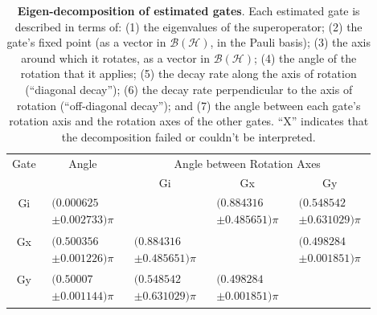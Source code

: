 \documentclass{article}[11pt]
\begin{document}
\begin{table}[h]
\begin{center}
\vspace{2em}
\begin{tabular}[l]{|c|c|c|c|c|}
\hline
\multirow{2}{*}{Gate} & \multirow{2}{*}{Angle} & \multicolumn{3}{c|}{Angle between Rotation Axes} \\ \cline{3-5}
 & & Gi & Gx & Gy \\ \hline
Gi & $ \begin{array}{c}(0.000625 \\ \pm 0.002733)\pi \end{array} $ &  & $ \begin{array}{c}(0.884316 \\ \pm 0.485651)\pi \end{array} $ & $ \begin{array}{c}(0.548542 \\ \pm 0.631029)\pi \end{array} $ \\ \hline
Gx & $ \begin{array}{c}(0.500356 \\ \pm 0.001226)\pi \end{array} $ & $ \begin{array}{c}(0.884316 \\ \pm 0.485651)\pi \end{array} $ &  & $ \begin{array}{c}(0.498284 \\ \pm 0.001851)\pi \end{array} $ \\ \hline
Gy & $ \begin{array}{c}(0.50007 \\ \pm 0.001144)\pi \end{array} $ & $ \begin{array}{c}(0.548542 \\ \pm 0.631029)\pi \end{array} $ & $ \begin{array}{c}(0.498284 \\ \pm 0.001851)\pi \end{array} $ &  \\ \hline
\end{tabular}

\caption{\textbf{Eigen-decomposition of estimated gates}.  Each estimated gate is described in terms of: (1) the eigenvalues of the superoperator; (2) the gate's fixed point (as a vector in $\mathcal{B}(\mathcal{H})$, in the Pauli basis); (3)  the axis around which it rotates, as a vector in $\mathcal{B}(\mathcal{H})$; (4) the angle of the rotation that it applies; (5) the decay rate along the axis of rotation (``diagonal decay''); (6) the decay rate perpendicular to the axis of rotation (``off-diagonal decay''); and (7) the angle between each gate's rotation axis and the rotation axes of the other gates.  ``X'' indicates that the decomposition failed or couldn't be interpreted. \label{bestGatesetDecompTable}}
\end{center}
\end{table}
\end{document}
